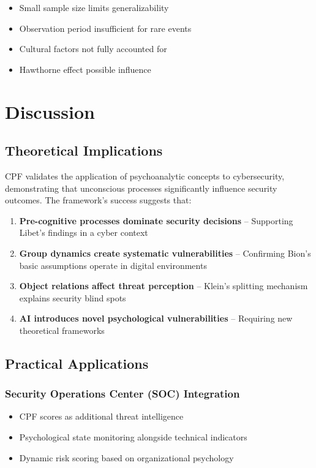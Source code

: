 \documentclass[11pt,a4paper]{article}
\begin{document}
\begin{itemize}
\item Small sample size limits generalizability
\item Observation period insufficient for rare events
\item Cultural factors not fully accounted for
\item Hawthorne effect possible influence
\end{itemize}

\section{Discussion}

\subsection{Theoretical Implications}

CPF validates the application of psychoanalytic concepts to cybersecurity, demonstrating that unconscious processes significantly influence security outcomes. The framework's success suggests that:

\begin{enumerate}
\item \textbf{Pre-cognitive processes dominate security decisions} -- Supporting Libet's findings in a cyber context
\item \textbf{Group dynamics create systematic vulnerabilities} -- Confirming Bion's basic assumptions operate in digital environments
\item \textbf{Object relations affect threat perception} -- Klein's splitting mechanism explains security blind spots
\item \textbf{AI introduces novel psychological vulnerabilities} -- Requiring new theoretical frameworks
\end{enumerate}

\subsection{Practical Applications}

\subsubsection{Security Operations Center (SOC) Integration}
\begin{itemize}
\item CPF scores as additional threat intelligence
\item Psychological state monitoring alongside technical indicators
\item Dynamic risk scoring based on organizational psychology
\end{itemize}
\end{document}

